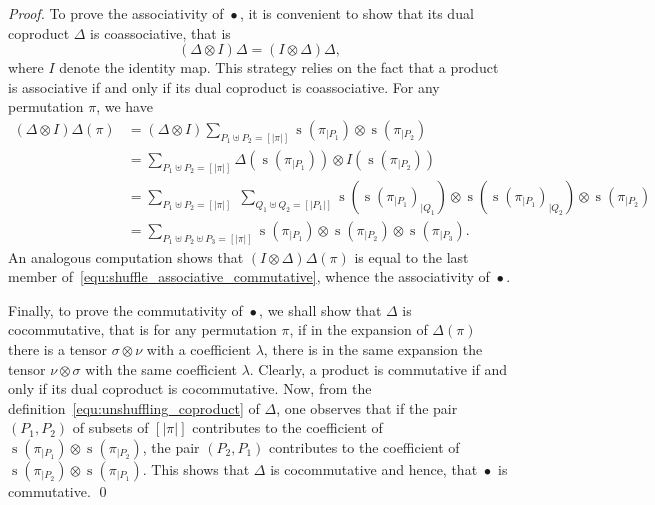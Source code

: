 \documentclass[a4paper,10pt]{llncs}
\DeclareMathOperator{\STD}{\mathrm{s}}
\DeclareMathOperator{\SHUFFLE}{\bullet}
\begin{document}
\begin{proof}
    To prove the associativity of $\SHUFFLE$, it is convenient to show
    that its dual coproduct $\Delta$ is coassociative, that is
    \begin{equation}
        (\Delta \otimes I) \Delta = (I \otimes \Delta) \Delta,
    \end{equation}
    where $I$ denote the identity map. This strategy relies on the fact
    that a product is associative if and only if its dual coproduct is
    coassociative. For any permutation $\pi$, we have
    \begin{equation} \begin{split}
    \label{equ:shuffle_associative_commutative}
        (\Delta \otimes I) \Delta(\pi) & =
        (\Delta \otimes I)
        \sum_{P_1 \uplus P_2 = [|\pi|]}
        \STD\left(\pi_{|P_1}\right) \otimes \STD\left(\pi_{|P_2}\right) \\
        & =
        \sum_{P_1 \uplus P_2 = [|\pi|]}
        \Delta\left(\STD\left(\pi_{|P_1}\right)\right)
        \otimes I\left(\STD\left(\pi_{|P_2}\right)\right) \\
        & =
        \sum_{P_1 \uplus P_2 = [|\pi|]} \;
        \sum_{Q_1 \uplus Q_2 = [|P_1|]}
        \STD\left(\STD\left(\pi_{|P_1}\right)_{|Q_1}\right)
        \otimes
        \STD\left(\STD\left(\pi_{|P_1}\right)_{|Q_2}\right)
        \otimes \STD\left(\pi_{|P_2}\right) \\
        & =
        \sum_{P_1 \uplus P_2 \uplus P_3 = [|\pi|]}
        \STD\left(\pi_{|P_1}\right) \otimes
        \STD\left(\pi_{|P_2}\right) \otimes
        \STD\left(\pi_{|P_3}\right).
    \end{split} \end{equation}
    An analogous computation shows that $(I \otimes \Delta) \Delta(\pi)$
    is equal to the last member
    of~\eqref{equ:shuffle_associative_commutative}, whence the
    associativity of $\SHUFFLE$.
    \smallskip

    Finally, to prove the commutativity of $\SHUFFLE$, we shall show
    that $\Delta$ is cocommutative, that is for any permutation $\pi$,
    if in the expansion of $\Delta(\pi)$ there is a tensor
    $\sigma \otimes \nu$ with a coefficient $\lambda$, there is in the
    same expansion the tensor $\nu \otimes \sigma$ with the same
    coefficient $\lambda$. Clearly, a product is commutative if and only
    if its dual coproduct is cocommutative. Now, from the
    definition~\eqref{equ:unshuffling_coproduct} of $\Delta$, one
    observes that if the pair $(P_1, P_2)$ of subsets of $[|\pi|]$
    contributes to the coefficient of
    $\STD\left(\pi_{|P_1}\right) \otimes \STD\left(\pi_{|P_2}\right)$,
    the pair $(P_2, P_1)$ contributes to the coefficient of
    $\STD\left(\pi_{|P_2}\right) \otimes \STD\left(\pi_{|P_1}\right)$.
    This shows that $\Delta$ is cocommutative and hence, that $\SHUFFLE$
    is commutative.
    \qed
\end{proof}
\medskip
\end{document}
